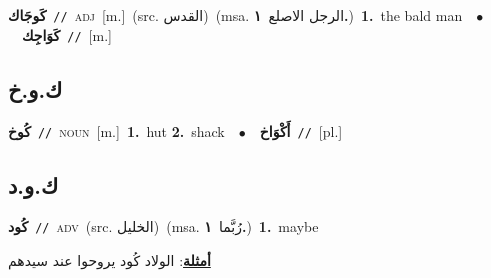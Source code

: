 \documentclass[10pt,a4paper,twoside]{article} %
\begin{document}
\begin{multicols}{2}
{\setlength\topsep{0pt}\textbf{\foreignlanguage{arabic}{كَوجَاك}}\ {\color{gray}\texttt{//}\color{black}}\ \textsc{adj}\ [m.]\ (src. \color{gray}\foreignlanguage{arabic}{القدس}\color{black})\ \color{gray}(msa. \foreignlanguage{arabic}{الرجل الاصلع}~\foreignlanguage{arabic}{\textbf{١.}})\color{black}\ \textbf{1.}~the bald man\ \ $\bullet$\ \ \setlength\topsep{0pt}\textbf{\foreignlanguage{arabic}{كَوَاجِك}}\ {\color{gray}\texttt{//}\color{black}}\ [m.]\ } \vspace{2mm}

\vspace{-3mm}
\subsection*{\color{blue}\foreignlanguage{arabic}{ك.و.خ}\color{blue}{}} 

{\setlength\topsep{0pt}\textbf{\foreignlanguage{arabic}{كُوخ}}\ {\color{gray}\texttt{//}\color{black}}\ \textsc{noun}\ [m.]\ \textbf{1.}~hut  \textbf{2.}~shack\ \ $\bullet$\ \ \setlength\topsep{0pt}\textbf{\foreignlanguage{arabic}{أَكْوَاخ}}\ {\color{gray}\texttt{//}\color{black}}\ [pl.]\ } \vspace{2mm}

\vspace{-3mm}
\subsection*{\color{blue}\foreignlanguage{arabic}{ك.و.د}\color{blue}{}} 

{\setlength\topsep{0pt}\textbf{\foreignlanguage{arabic}{كُود}}\ {\color{gray}\texttt{//}\color{black}}\ \textsc{adv}\ (src. \color{gray}\foreignlanguage{arabic}{الخليل}\color{black})\ \color{gray}(msa. \foreignlanguage{arabic}{رُبَّما}~\foreignlanguage{arabic}{\textbf{١.}})\color{black}\ \textbf{1.}~maybe\  \begin{flushright}\color{gray}\foreignlanguage{arabic}{\textbf{\underline{\foreignlanguage{arabic}{أمثلة}}}: الولاد كُود يروحوا عند سيدهم}\end{flushright}\color{black}} \vspace{2mm}


\end{multicols}
\end{document}
